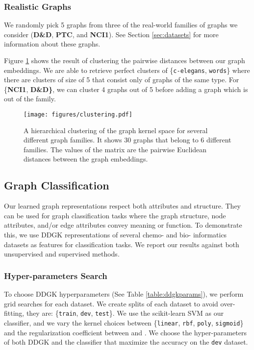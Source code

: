 \documentclass[sigconf]{acmart}
\newcommand{\ours}{\textsc{DDGK}}
\begin{document}
\subsubsection{Realistic Graphs}
We randomly pick 5 graphs from three of the real-world families of graphs we consider (\textbf{D\&D}, \textbf{PTC}, and \textbf{NCI1}).
See Section \ref{sec:datasets} for more information about these graphs.

Figure \ref{fig:clusters30} shows the result of clustering the pairwise distances between our graph embeddings.
We are able to retrieve perfect clusters of \{\texttt{c-elegans}, \texttt{words}\} where there are clusters of size of 5 that consist only of graphs of the same type.
For \{\textbf{NCI1}, \textbf{D\&D\}}, we can cluster 4 graphs out of 5 before adding a graph which is out of the family.

\begin{figure}
    \centering
    \texttt{[image: figures/clustering.pdf]}
    \vspace{3mm}
    \caption{A hierarchical clustering of the graph kernel space for several different graph families.  It shows 30 graphs that belong to 6 different families.
    The values of the matrix are the pairwise Euclidean distances between the graph embeddings.
    }
    \label{fig:clusters30}
\end{figure}



\subsection{Graph Classification}



Our learned graph representations respect both attributes and structure.
They can be used for graph classification tasks where the graph structure, node attributes, and/or edge attributes convey meaning or function.
To demonstrate this, we use \ours{} representations of several chemo- and bio- informatics datasets as features for classification tasks.
We report our results against both unsupervised and supervised methods.




\subsubsection{Hyper-parameters Search}
To choose \ours{} hyperparameters (See Table \ref{table:ddgkparams}), we perform grid searches for each dataset.
We create splits of each dataset to avoid over-fitting, they are: \{\texttt{train}, \texttt{dev}, \texttt{test}\}.
We use the scikit-learn SVM \cite{pedregosa2011scikit} as our classifier, and we vary the kernel choices between \{\texttt{linear}, \texttt{rbf}, \texttt{poly}, \texttt{sigmoid}\} and the regularization coefficient  between  and .
We choose the hyper-parameters of both \ours{} and the classifier that maximize the accuracy on the \texttt{dev} dataset.
\end{document}
